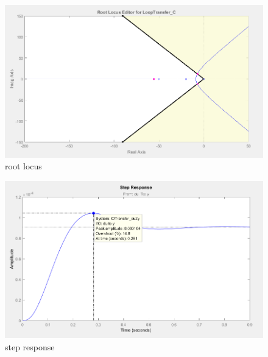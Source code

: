 \documentclass[11pt]{article}
\begin{document}
\begin{figure}[H]
  \includegraphics[scale=0.7, center]{4}
  \caption{root locus}
  \label{fig:zero}
\end{figure}
\begin{figure}[H]
  \includegraphics[scale=0.7, center]{4b}
  \caption{step response}
  \label{fig:zero}
\end{figure}
\end{document}
